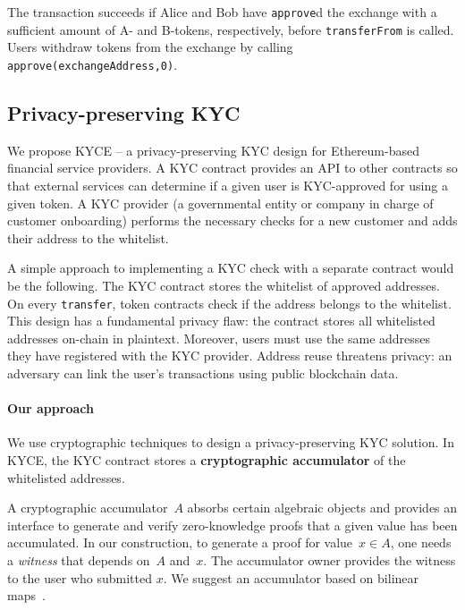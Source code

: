 The transaction succeeds if Alice and Bob have \texttt{approve}d the exchange with a sufficient amount of A- and B-tokens, respectively, before \texttt{transferFrom} is called.
Users withdraw tokens from the exchange by calling \texttt{approve(exchangeAddress,0)}.



\subsection{Privacy-preserving KYC}
\label{sec:PrivacyPreservingKYC}

We propose KYCE -- a privacy-preserving KYC design for Ethereum-based financial service providers.
A KYC contract provides an API to other contracts so that external services can determine if a given user is KYC-approved for using a given token.
A KYC provider (a governmental entity or company in charge of customer onboarding) performs the necessary checks for a new customer and adds their address to the whitelist.

A simple approach to implementing a KYC check with a separate contract would be the following.
The KYC contract stores the whitelist of approved addresses.
On every \texttt{transfer}, token contracts check if the address belongs to the whitelist.
This design has a fundamental privacy flaw: the contract stores all whitelisted addresses on-chain in plaintext.
Moreover, users must use the same addresses they have registered with the KYC provider.
Address reuse threatens privacy: an adversary can link the user's transactions using public blockchain data.

\paragraph{Our approach}
We use cryptographic techniques to design a privacy-preserving KYC solution.
In KYCE, the KYC contract stores a \textbf{cryptographic accumulator} of the whitelisted addresses.

A cryptographic accumulator~$A$ absorbs certain algebraic objects and provides an interface to generate and verify zero-knowledge proofs that a given value has been accumulated.
In our construction, to generate a proof for value~$x\in A$, one needs a \textit{witness} that depends on~$A$ and~$x$.
The accumulator owner provides the witness to the user who submitted $x$.
We suggest an accumulator based on bilinear maps~\cite{Camenisch2009}.

